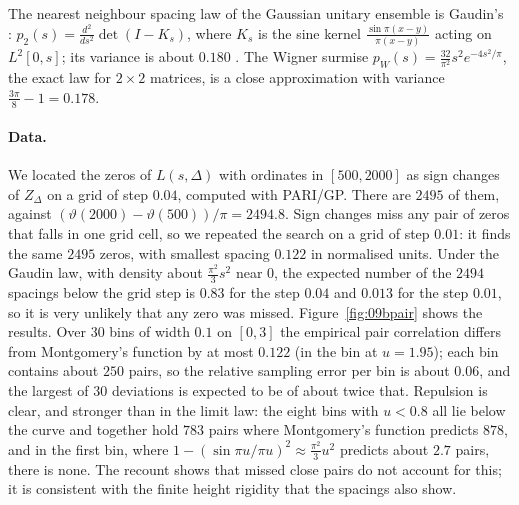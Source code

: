 The nearest neighbour spacing law of the Gaussian unitary ensemble is Gaudin's \cite{gaudin1961}: $p_2(s)=\frac{d^2}{ds^2}\det(I-K_s)$, where $K_s$ is the sine kernel $\frac{\sin\pi(x-y)}{\pi(x-y)}$ acting on $L^2[0,s]$; its variance is about $0.180$ \cite{mehta2004}. The Wigner surmise $p_W(s)=\frac{32}{\pi^2}s^2e^{-4s^2/\pi}$, the exact law for $2\times2$ matrices, is a close approximation with variance $\frac{3\pi}8-1=0.178$.

\paragraph{Data.} We located the zeros of $L(s,\Delta)$ with ordinates in $[500,2000]$ as sign changes of $Z_\Delta$ on a grid of step $0.04$, computed with PARI/GP. There are $2495$ of them, against $(\vartheta(2000)-\vartheta(500))/\pi=2494.8$. Sign changes miss any pair of zeros that falls in one grid cell, so we repeated the search on a grid of step $0.01$: it finds the same $2495$ zeros, with smallest spacing $0.122$ in normalised units. Under the Gaudin law, with density about $\frac{\pi^2}3s^2$ near $0$, the expected number of the $2494$ spacings below the grid step is $0.83$ for the step $0.04$ and $0.013$ for the step $0.01$, so it is very unlikely that any zero was missed. Figure~\ref{fig:09bpair} shows the results. Over $30$ bins of width $0.1$ on $[0,3]$ the empirical pair correlation differs from Montgomery's function by at most $0.122$ (in the bin at $u=1.95$); each bin contains about $250$ pairs, so the relative sampling error per bin is about $0.06$, and the largest of $30$ deviations is expected to be of about twice that. Repulsion is clear, and stronger than in the limit law: the eight bins with $u<0.8$ all lie below the curve and together hold $783$ pairs where Montgomery's function predicts $878$, and in the first bin, where $1-(\sin\pi u/\pi u)^2\approx\frac{\pi^2}{3}u^2$ predicts about $2.7$ pairs, there is none. The recount shows that missed close pairs do not account for this; it is consistent with the finite height rigidity that the spacings also show.

